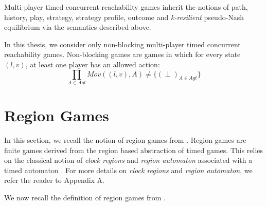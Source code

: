 Multi-player timed concurrent reachability games inherit the notions of path, history, play, strategy, strategy profile, outcome and \textit{k-resilient} pseudo-Nash equilibrium via the semantics described above.

In this thesis, we consider only non-blocking multi-player timed concurrent reachability games. Non-blocking games are games in which for every state $(l, v)$, at least one player has an allowed action:
\[\prod \limits_{A \in Agt} Mov((l, v), A) \neq \lbrace (\perp)_{A\in Agt} \rbrace\]

\section{Region Games}

In this section, we recall the notion of region games from \cite{BBM-concur10,BBM-report}. Region games are finite games derived from the region based abstraction of timed games. This relies on the classical notion of \textit{clock regions} and \textit{region automaton} associated with a timed automaton \cite{1}. For more details on \textit{clock regions} and \textit{region automaton}, we refer the reader to Appendix A.

We now recall the definition of region games from \cite{BBM-concur10,BBM-report}.

